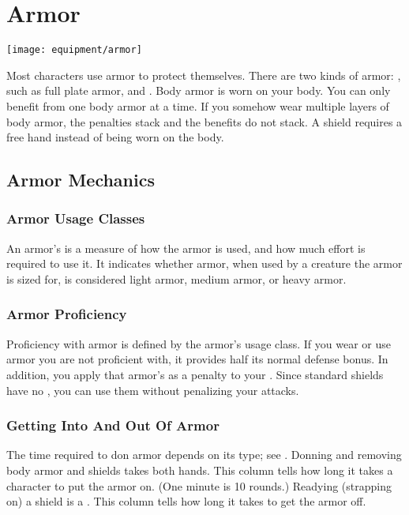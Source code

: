     

    

\newpage
\section{Armor}\label{Armor}
    \texttt{[image: equipment/armor]}

    Most characters use armor to protect themselves. There are two kinds of armor: , such as full plate armor, and .
    Body armor is worn on your body.
    You can only benefit from one body armor at a time.
    If you somehow wear multiple layers of body armor, the penalties stack and the benefits do not stack.
    A shield requires a free hand instead of being worn on the body.

    \subsection{Armor Mechanics}

        \subsubsection{Armor Usage Classes}\label{Armor Usage Classes}
            An armor's  is a measure of how the armor is used, and how much effort is required to use it.
            It indicates whether armor, when used by a creature the armor is sized for, is considered light armor, medium armor, or heavy armor.

        \subsubsection{Armor Proficiency}\label{Armor Proficiency}
            Proficiency with armor is defined by the armor's usage class.
            If you wear or use armor you are not proficient with, it provides half its normal defense bonus.
            In addition, you apply that armor's  as a penalty to your .
            Since standard shields have no , you can use them without penalizing your attacks.

        \subsubsection{Getting Into And Out Of Armor}
            The time required to don armor depends on its type; see . Donning and removing body armor and shields takes both hands.
             This column tells how long it takes a character to put the armor on. (One minute is 10 rounds.) Readying (strapping on) a shield is a .
             This column tells how long it takes to get the armor off.

